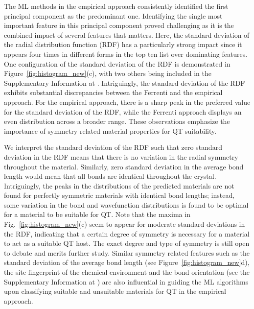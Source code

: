 \documentclass[superscriptaddress,
preprint,
 amsmath,amssymb,
 aps,
]{revtex4-2}
\begin{document}
The ML methods in the empirical approach consistently identified the first principal component as the predominant one. Identifying the single most important feature in this principal component proved challenging as it is the combined impact of several features that matters. 
Here, the standard deviation of the radial distribution function (RDF) has a  particularly strong impact since it appears four times in different forms in the top ten list over dominating features. One configuration of the standard deviation of the RDF is demonstrated in Figure~\ref{fig:histogram_new}(c), with two others being included in the Supplementary Information at \cite{supplementary}. Intriguingly, the standard deviation of the RDF exhibits substantial discrepancies between the Ferrenti and the empirical approach. For the empirical approach, there is a sharp peak in the preferred value for the standard deviation of the RDF, while the Ferrenti approach displays an even distribution across a broader range. 
These observations emphasize the importance of symmetry related material properties for QT suitability. 

We interpret the standard deviation  of the RDF such that zero standard deviation in the RDF means that there is no variation in the radial symmetry throughout the material. Similarly, zero standard deviation in the average bond length would mean that all bonds are identical throughout the crystal. Intriguingly, the peaks in the distributions of the predicted materials are not found for perfectly symmetric materials with identical bond lengths; instead, some variation in the bond and wavefunction distributions is found to be optimal for a material to be suitable for QT.  
Note that the maxima in  Fig.~\ref{fig:histogram_new}(c) seem to appear for moderate standard deviations in the RDF, indicating that a certain degree of symmetry is necessary for a material to act as a suitable QT host. The exact degree and type of symmetry is still open to debate and merits further study. 
Similar symmetry related features such as the standard deviation of the average bond length (see Figure~\ref{fig:histogram_new}d), the site fingerprint of the chemical environment and the bond orientation (see the Supplementary Information at \cite{supplementary}) are also influential in guiding the ML algorithms upon classifying suitable and unsuitable materials for QT in the empirical approach. 
\end{document}

